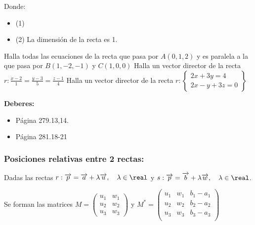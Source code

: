 Donde:
\begin{itemize}
    \item (1) 
    \item (2) 
    \subitem \obs {}
    \subitem \obs La dimensión de la recta es 1.
\end{itemize}

\begin{problem}
    \ppart 
    Halla todas las ecuaciones de la recta que pasa por $A(0,1,2)$ y es paralela a la que pasa por $B(1,-2,-1)$ y $C(1,0,0)$
    \ppart 
    Halla un vector director de la recta $r:\displaystyle\frac{x-2}{1} = \frac{y-3}{5} = \frac{z-1}{4}$
    \ppart 
    Halla un vector director de la recta $r:\displaystyle\left\{\begin{array}{c} 2x+3y=4\\2x-y+3z=0\end{array}\right\}$
    \solution

\end{problem}

\textbf{Deberes:} 
\begin{itemize}
  \item Página 279.13,14.
  \item Página 281.18-21
\end{itemize}

\subsubsection{Posiciones relativas entre 2 rectas:}

Dadas las rectas 
$r:\vec{p} = \vec{a} + \lambda\vec{u},\quad \lambda\in\real$
y
$s:\vec{p} = \vec{b} + \lambda\vec{w},\quad \lambda\in\real$. 

Se forman las matrices 
$M  = \displaystyle\begin{pmatrix}
u_1&w_1\\
u_2&w_2\\
u_3&w_3
\end{pmatrix}
$ y 
$M^* = \displaystyle\begin{pmatrix}
u_1&w_1&b_1-a_1\\
u_2&w_2&b_2-a_2\\
u_3&w_3&b_3-a_3\\
\end{pmatrix}
$

